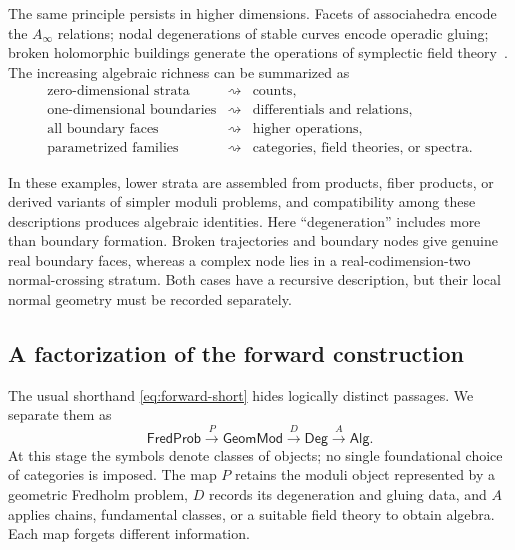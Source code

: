 \documentclass[11pt,letterpaper,twoside]{article}
\theoremstyle{plain}
\theoremstyle{definition}
\theoremstyle{remark}
\let\cite\citep
\newcommand{\Alg}{\mathsf{Alg}}
\newcommand{\Deg}{\mathsf{Deg}}
\newcommand{\GeomMod}{\mathsf{GeomMod}}
\newcommand{\FredProb}{\mathsf{FredProb}}
\newcommand{\Ainf}{A_\infty}
\begin{document}
The same principle persists in higher dimensions.  Facets of associahedra encode the \(\Ainf\) relations; nodal degenerations of stable curves encode operadic gluing; broken holomorphic buildings generate the operations of symplectic field theory~\cite{stasheff1963,getzlerkapranov1998,eliashberg2000}.  The increasing algebraic richness can be summarized as
\[
\begin{array}{ccl}
\text{zero-dimensional strata} &\rightsquigarrow& \text{counts},\\
\text{one-dimensional boundaries}&\rightsquigarrow&\text{differentials and relations},\\
\text{all boundary faces}&\rightsquigarrow&\text{higher operations},\\
\text{parametrized families}&\rightsquigarrow&\text{categories, field theories, or spectra}.
\end{array}
\]

In these examples, lower strata are assembled from products, fiber products, or derived variants of simpler moduli problems, and compatibility among these descriptions produces algebraic identities.  Here ``degeneration'' includes more than boundary formation.  Broken trajectories and boundary nodes give genuine real boundary faces, whereas a complex node lies in a real-codimension-two normal-crossing stratum.  Both cases have a recursive description, but their local normal geometry must be recorded separately.

\subsection{A factorization of the forward construction}

The usual shorthand \eqref{eq:forward-short} hides logically distinct passages.  We separate them as
\begin{equation}\label{eq:forward-cats}
 \FredProb \xrightarrow{\;P\;} \GeomMod
 \xrightarrow{\;D\;} \Deg
 \xrightarrow{\;A\;} \Alg.
\end{equation}
At this stage the symbols denote classes of objects; no single foundational choice of categories is imposed.  The map \(P\) retains the moduli object represented by a geometric Fredholm problem, \(D\) records its degeneration and gluing data, and \(A\) applies chains, fundamental classes, or a suitable field theory to obtain algebra.  Each map forgets different information.
\end{document}
